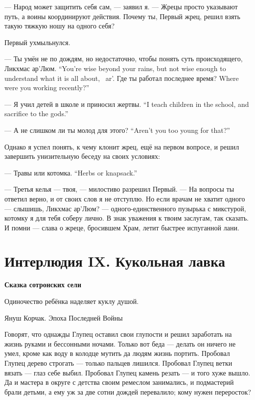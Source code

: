 --- Народ может защитить себя сам, --- заявил я.
--- Жрецы просто указывают путь, а воины координируют действия.
Почему ты, Первый жрец, решил взять такую тяжкую ношу на одного себя?

Первый ухмыльнулся.

{--- Ты умён не по дождям, но недостаточно, чтобы понять суть происходящего, Ликхмас ар'Люм.}
{``You're wise beyond your rains, but not wise enough to understand what it is all about, \Likchmas\ ar'\Loem.}
{Где ты работал последнее время?}
{Where were you working recently?''}

{--- Я учил детей в школе и приносил жертвы.}
{``I teach children in the school, and sacrifice to the gods.''}

{--- А не слишком ли ты молод для этого?}
{``Aren't you too young for that?''}

Однако я успел понять, к чему клонит жрец, ещё на первом вопросе, и решил завершить унизительную беседу на своих условиях:

{--- Травы или котомка\FM.}
{``Herbs or knapsack\FM.''}

--- Третья келья --- твоя, --- милостиво разрешил Первый.
--- На вопросы ты ответил верно, и от своих слов я не отступлю.
Но если врачам не хватит одного --- слышишь, Ликхмас ар'Люм? --- одного-единственного пузырька с микстурой, котомку я для тебя соберу лично.
В знак уважения к твоим заслугам, так сказать.
И помни --- слава о жреце, бросившем Храм, летит быстрее испуганной лани.

\chapter*{Интерлюдия IX. Кукольная лавка}

\textbf{Сказка сотронских сели}

\epigraph
{Одиночество ребёнка наделяет куклу душой.}
{Януш Корчак.
Эпоха Последней Войны}

Говорят, что однажды Глупец оставил свои глупости и решил заработать на жизнь руками и бессонными ночами.
Только вот беда --- делать он ничего не умел, кроме как воду в колодце мутить да людям жизнь портить.
Пробовал Глупец дерево строгать --- только пальцев лишился.
Пробовал Глупец ветки вязать --- глаз себе выбил.
Пробовал Глупец камень резать --- и того хуже вышло.
Да и мастера в округе с детства своим ремеслом занимались, и подмастерий брали детьми, а ему уж за две сотни дождей перевалило;
кому нужен переросток?

